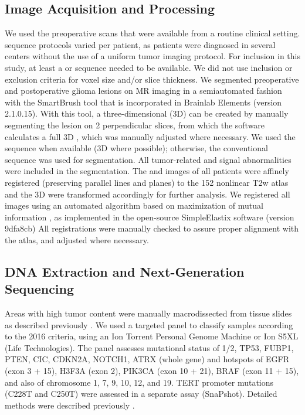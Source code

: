 \subsection{Image Acquisition and Processing}
We used the preoperative  scans that were available from a routine clinical setting.
 sequence protocols varied per patient, as patients were diagnosed in several centers without the use of a uniform \gls{tumor}  imaging protocol.
For inclusion in this study, at least a  or  sequence needed to be available.
We did not use inclusion or exclusion criteria for voxel size and/or slice thickness.
We segmented preoperative and postoperative glioma lesions on MR imaging in a semiautomated fashion with the SmartBrush tool that is incorporated in Brainlab Elements (version 2.1.0.15).
With this tool, a three-dimensional (3D)  can be created by manually segmenting the lesion on 2 perpendicular slices, from which the software calculates a full 3D , which was manually adjusted where necessary.
We used the  sequence when available (3D where possible); otherwise, the conventional  sequence was used for segmentation.
All \gls{tumor}-related  and  signal abnormalities were included in the segmentation.
The  and  images of all patients were affinely registered (preserving parallel lines and planes) to the   152 nonlinear T2w atlas \autocite{fonov2011unbiased, fonov2009unbiased} and the 3D  were transformed accordingly for further analysis.
We registered all  images using an automated algorithm based on maximization of mutual information \autocite{klein2009adaptive}, as implemented in the open-source SimpleElastix software (version 9dfa8cb) \autocite{marstal2016simpleelastix}
All registrations were manually checked to assure proper alignment with the atlas, and adjusted where necessary.

\subsection{DNA Extraction and Next-Generation Sequencing}

Areas with high \gls{tumor} content were manually macrodissected from  tissue slides as described previously \autocite{wijnenga2017impact}.
We used a targeted  panel to classify samples according to the  2016 criteria, using an Ion Torrent Personal Genome Machine or Ion S5XL (Life Technologies).
The panel assesses mutational status of 1/2, TP53, FUBP1, PTEN, CIC, CDKN2A, NOTCH1, ATRX (whole gene) and hotspots of EGFR (exon 3 + 15), H3F3A (exon 2), PIK3CA (exon 10 + 21), BRAF (exon 11 + 15), and also  of chromosome 1, 7, 9, 10, 12, and 19.
TERT promoter mutations (C228T and C250T) were assessed in a separate assay (SnaPshot).
Detailed methods were described previously \autocite{wijnenga2017impact, wijnenga2018prognostic}.

